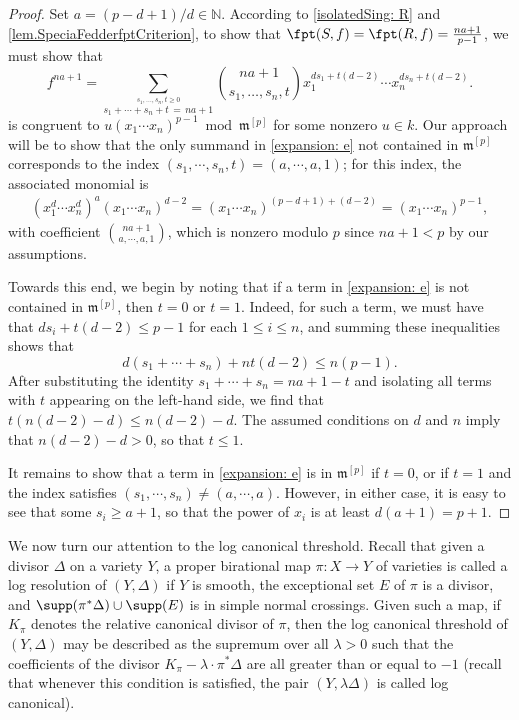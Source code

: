 \documentclass[11pt]{amsart}
\begin{document}
\begin{proof}  Set $a = (p-d+1)/d \in \mathbb{N}$.  According to \autoref{isolatedSing: R} and \autoref{lem.SpeciaFedderfptCriterion}, to show that $\fpt(S,f) = \fpt(R, f) = \frac{n a+1}{p-1}$, we must show that
\begin{equation} \label{expansion: e}
f^{na+1} = \sum_{\overset{s_1, \ldots, s_n, t \geq 0}{s_1 + \cdots + s_n + t\,=\,n a+1}} \binom{na+1}{s_1, \ldots, s_n, t} x_1^{ds_1 + t(d-2)} \cdots x_n^{ds_n +t(d-2)}.
\end{equation}
is congruent to $u (x_1 \cdots x_n)^{p-1} \bmod {\mathfrak{m}}^{[p]}$ for some nonzero $u \in k$.  Our approach will be to show that the only summand in \eqref{expansion: e} not contained in ${\mathfrak{m}}^{[p]}$ corresponds to the index $(s_1, \cdots, s_n, t) = (a, \cdots, a, 1)$; for this index, the associated monomial is
\[
\begin{array}{rl}
 (x_1^d \cdots x_n^d)^a (x_1 \cdots x_n)^{d-2}
=  (x_1 \cdots x_n)^{ (p-d+1) + (d-2)}
=  (x_1 \cdots x_n)^{ p-1},
\end{array}
\]
with coefficient $\binom{na + 1}{a, \cdots, a, 1}$,
which is nonzero modulo $p$ since $na+1 < p$ by our assumptions.

Towards this end, we begin by noting that if a term in \eqref{expansion: e} is not contained in ${\mathfrak{m}}^{[p]}$, then $t = 0$ or $t=1$.  Indeed, for such a term, we must have that $ds_i + t(d-2) \leq p-1$ for each $1 \leq i \leq n$, and summing these inequalities shows that
\[
d (s_1+\cdots+s_n) + nt(d-2) \leq n(p-1).
\]
After substituting the identity $s_1 + \cdots + s_n = n a +1-t$ and isolating all terms with $t$ appearing on the left-hand side, we find that
$t(n(d-2) - d) \leq n(d-2) - d$.
The assumed conditions on $d$ and $n$ imply that $n(d-2)- d  > 0$, so that $t \leq 1$.

It remains to show that a term in \eqref{expansion: e} is in ${\mathfrak{m}}^{[p]}$ if $t = 0$, or if $t=1$ and the index satisfies $(s_1, \cdots, s_n) \neq (a, \cdots, a)$.  However, in either case, it is easy to see that some $s_i \geq a+1$, so that the power of $x_i$ is at least $d(a + 1) = p+1$.
\end{proof}

We now turn our attention to the log canonical threshold.   Recall that given a divisor $\Delta$ on a variety $Y$, a proper birational map $\pi: X \to Y$ of varieties is called a log resolution of $(Y, \Delta)$ if $Y$ is smooth, the exceptional set $E$ of $\pi$ is a divisor, and
$\supp(\pi^{\ast} \Delta) \cup \supp(E)$ is in simple normal crossings.
Given such a map, if $K_{\pi}$ denotes the relative canonical divisor of $\pi$, then the log canonical threshold of $(Y, \Delta)$ may be described as the supremum over all $\lambda > 0$ such that the coefficients of the divisor $K_{\pi} - \lambda \cdot \pi^{\ast} \Delta$ are all greater than or equal to $-1$  (recall that whenever this condition is satisfied, the pair $(Y, \lambda \Delta)$ is called log canonical).
\end{document}
